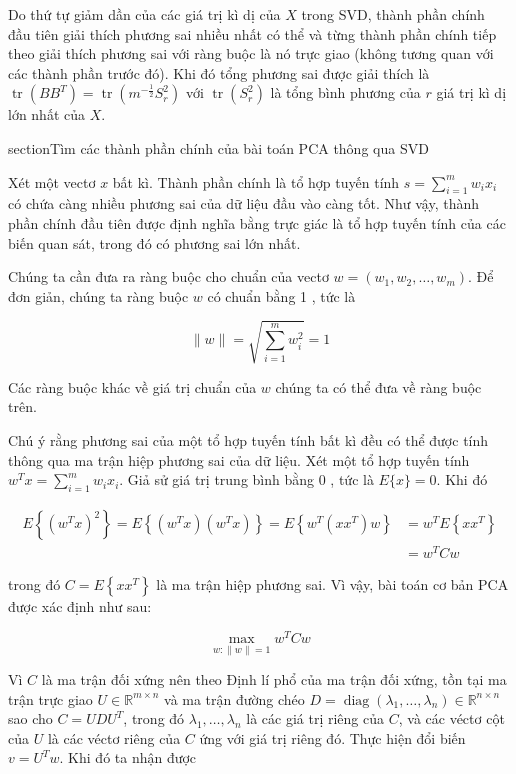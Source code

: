 \documentclass[12pt,a4paper,oneside]{report}
\numberwithin{equation}{section}
\begin{document}
Do thứ tự giảm dần của các giá trị kì dị của $X$ trong SVD, thành phần chính đầu tiên giải thích phương sai nhiều nhất có thể và từng thành phần chính tiếp theo giải thích phương sai với ràng buộc là nó trực giao (không tương quan với các thành phần trước đó). Khi đó tổng phương sai được giải thích là $\operatorname{tr}\left(B B^{T}\right)=\operatorname{tr}\left(m^{-\frac{1}{2}} S_{r}^{2}\right)$ với $\operatorname{tr}\left(S_{r}^{2}\right)$ là tổng bình phương của $r$ giá trị kì dị lớn nhất của $X$.

section{Tìm các thành phần chính của bài toán PCA thông qua SVD}

Xét một vectơ $x$ bất kì. Thành phần chính là tổ hợp tuyến tính $s=\sum_{i=1}^{m} w_{i} x_{i}$ có chứa càng nhiều phương sai của dữ liệu đầu vào càng tốt. Như vậy, thành phần chính đầu tiên được định nghĩa bằng trực giác là tổ hợp tuyến tính của các biến quan sát, trong đó có phương sai lớn nhất.

Chúng ta cần đưa ra ràng buộc cho chuẩn của vectơ $w=\left(w_{1}, w_{2}, \ldots, w_{m}\right)$. Để đơn giản, chúng ta ràng buộc $w$ có chuẩn bằng 1 , tức là

$$
\|w\|=\sqrt{\sum_{i=1}^{m} w_{i}^{2}}=1
$$

Các ràng buộc khác về giá trị chuẩn của $w$ chúng ta có thể đưa về ràng buộc trên.

Chú ý rằng phương sai của một tổ hợp tuyến tính bất kì đều có thể được tính thông qua ma trận hiệp phương sai của dữ liệu. Xét một tổ hợp tuyến tính $w^{T} x=\sum_{i=1}^{m} w_{i} x_{i}$. Giả sử giá trị trung bình bằng 0 , tức là $E\{x\}=0$. Khi đó

$$
\begin{aligned}
	E\left\{\left(w^{T} x\right)^{2}\right\}=E\left\{\left(w^{T} x\right)\left(w^{T} x\right)\right\}=E\left\{w^{T}\left(x x^{T}\right) w\right\} & =w^{T} E\left\{x x^{T}\right\} \\
	& =w^{T} C w
\end{aligned}
$$

trong đó $C=E\left\{x x^{T}\right\}$ là ma trận hiệp phương sai. Vì vậy, bài toán cơ bản $\mathrm{PCA}$ được xác định như sau:

$$
\max _{w:\|w\|=1} w^{T} C w
$$

Vì $C$ là ma trận đối xứng nên theo Định lí phổ của ma trận đối xứng, tồn tại ma trận trực giao $U \in \mathbb{R}^{m \times n}$ và ma trận đường chéo $D=\operatorname{diag}\left(\lambda_{1}, \ldots, \lambda_{n}\right) \in \mathbb{R}^{n \times n}$ sao cho $C=U D U^{T}$, trong đó $\lambda_{1}, \ldots, \lambda_{n}$ là các giá trị riêng của $C$, và các véctơ cột của $U$ là các véctơ riêng của $C$ ứng với giá trị riêng đó. Thực hiện đổi biến $v=U^{T} w$. Khi đó ta nhận được
\end{document}
